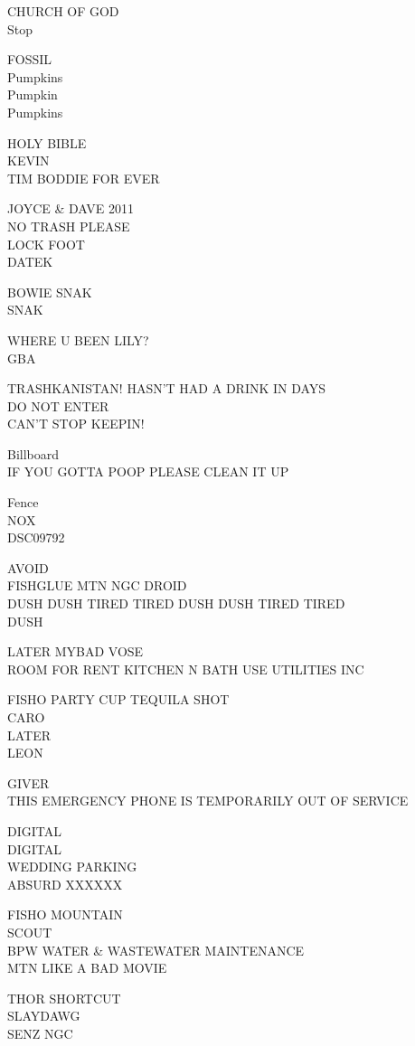 \documentclass[10pt,letterpaper]{article}
\begin{document}
CHURCH OF GOD\\
Stop

FOSSIL\\
Pumpkins\\
Pumpkin\\
Pumpkins

HOLY BIBLE\\
KEVIN\\
TIM BODDIE FOR EVER

JOYCE \& DAVE 2011\\
NO TRASH PLEASE\\
LOCK FOOT\\
DATEK

BOWIE SNAK\\
SNAK

WHERE U BEEN LILY?\\
GBA

TRASHKANISTAN! HASN'T HAD A DRINK IN DAYS\\
DO NOT ENTER\\
CAN'T STOP KEEPIN!

Billboard\\
IF YOU GOTTA POOP PLEASE CLEAN IT UP

Fence\\
NOX\\
DSC09792

AVOID\\
FISHGLUE MTN NGC DROID\\
DUSH DUSH TIRED TIRED DUSH DUSH TIRED TIRED\\
DUSH

LATER MYBAD VOSE\\
ROOM FOR RENT KITCHEN N BATH USE UTILITIES INC

FISHO PARTY CUP TEQUILA SHOT\\
CARO\\
LATER\\
LEON

GIVER\\
THIS EMERGENCY PHONE IS TEMPORARILY OUT OF SERVICE

DIGITAL\\
DIGITAL\\
WEDDING PARKING\\
ABSURD XXXXXX

FISHO MOUNTAIN\\
SCOUT\\
BPW WATER \& WASTEWATER MAINTENANCE\\
MTN LIKE A BAD MOVIE

THOR SHORTCUT\\
SLAYDAWG\\
SENZ NGC
\end{document}
